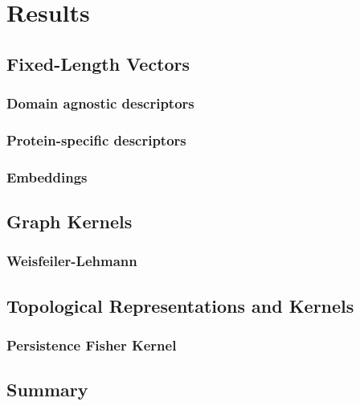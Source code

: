 \chapter{Results}

\section{Fixed-Length Vectors}

\subsection{Domain agnostic descriptors}

\subsection{Protein-specific descriptors}

\subsection{Embeddings}

\section{Graph Kernels}

\subsection{Weisfeiler-Lehmann}

\section{Topological Representations and Kernels}

\subsection{Persistence Fisher Kernel}

\section{Summary}
